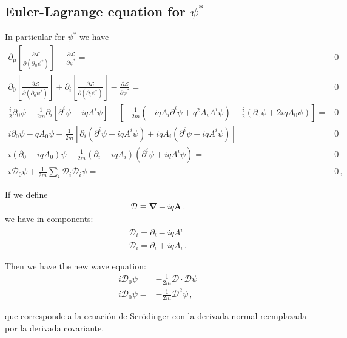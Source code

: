 \begin{subappendices}
\subsection{Euler-Lagrange equation for $\psi^*$}
In particular for $\psi^*$ we have
\begin{align}
  \partial_\mu\left[\frac{\partial\mathcal{L}}{\partial(\partial_\mu\psi^*)}\right]-\frac{\partial\mathcal{L}}{\partial\psi^*}=&0\nonumber\\
  \partial_0\left[\frac{\partial\mathcal{L}}{\partial(\partial_0\psi^*)}\right]+\partial_i\left[\frac{\partial\mathcal{L}}{\partial(\partial_i\psi^*)}\right]-\frac{\partial\mathcal{L}}{\partial\psi^*}=&0\nonumber\\
  \frac{i}{2}\partial_0\psi-\frac{1}{2m}\partial_i\left[\partial^i\psi+i q A^i\psi\right]
-\left[-\frac{1}{2m}\left(-i q A_i\partial^i\psi+q^2A_iA^i\psi\right)
-\frac{i}{2}\left(\partial_0\psi+2 i q A_0\psi\right)\right]=&0\nonumber\\
  i\partial_0\psi-q A_0\psi-\frac{1}{2m}\left[\partial_i\left(\partial^i\psi+i q A^i\psi\right)
+i q A_i\left(\partial^i\psi+i q A^i\psi\right)\right]
=&0\nonumber\\
  i(\partial_0+i q A_0)\psi-\frac{1}{2m}(\partial_i+i q A_i)(\partial^i\psi+i q A^i\psi)
=&0\nonumber\\
   i\mathcal{D}_0\psi
  +\frac{1}{2m}\sum_i\mathcal{D}_i\mathcal{D}_i\psi=&0\,,
\end{align}

If we define
\begin{align}
  \boldsymbol{\mathcal{D}}\equiv\boldsymbol{\nabla}-i q \mathbf{A}\,.
\end{align}
we have in components:
\begin{align}
    \boldsymbol{\mathcal{D}}_i=\partial_i-i q A^i\nonumber\\
    \boldsymbol{\mathcal{D}}_i=\partial_i+i q A_i\,.
\end{align}

Then we have the new wave equation:
\begin{align}
  i\mathcal{D}_0\psi=&-\frac{1}{2m}\boldsymbol{\mathcal{D}}\cdot\boldsymbol{\mathcal{D}}\psi\nonumber\\
i\mathcal{D}_0\psi=&-\frac{1}{2m}\boldsymbol{\mathcal{D}}^2\psi\,,
\end{align}

que corresponde a la ecuación de Scrödinger con la derivada normal reemplazada por la derivada covariante.




\end{subappendices}
